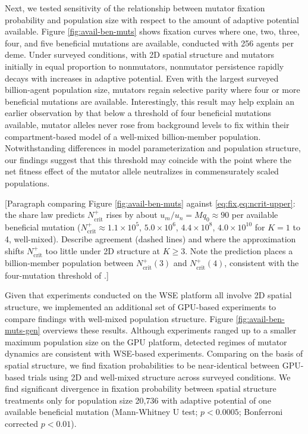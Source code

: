 

Next, we tested sensitivity of the relationship between mutator fixation probability and population size with respect to the amount of adaptive potential available.
Figure \ref{fig:avail-ben-muts} shows fixation curves where one, two, three, four, and five beneficial mutations are available, conducted with 256 agents per deme.
Under surveyed conditions, with 2D spatial structure and mutators initially in equal proportion to nonmutators, nonmutator persistence rapidly decays with increases in adaptive potential.
Even with the largest surveyed billion-agent population size, mutators regain selective parity where four or more beneficial mutations are available.
Interestingly, this result may help explain an earlier observation by \citet{tenaillon1999mutators} that below a threshold of four beneficial mutations available, mutator alleles never rose from background levels to fix within their compartment-based model of a well-mixed billion-member population.
Notwithstanding differences in model parameterization and population structure, our findings suggest that this threshold may coincide with the point where the net fitness effect of the mutator allele neutralizes in commensurately scaled populations.

[Paragraph comparing Figure \ref{fig:avail-ben-muts} against \cref{eq:fix,eq:ncrit-upper}: the share law predicts $N_\mathrm{crit}^{+}$ rises by about $u_m / u_n = M q_0 \approx 90$ per available beneficial mutation ($N_\mathrm{crit}^{+} \approx 1.1 \times 10^5$, $5.0 \times 10^6$, $4.4 \times 10^8$, $4.0 \times 10^{10}$ for $K = 1$ to 4, well-mixed). Describe agreement (dashed lines) and where the approximation shifts $N_\mathrm{crit}^{+}$ too little under 2D structure at $K \geq 3$. Note the prediction places a billion-member population between $N_\mathrm{crit}^{+}(3)$ and $N_\mathrm{crit}^{+}(4)$, consistent with the four-mutation threshold of \citet{tenaillon1999mutators}.]



Given that experiments conducted on the WSE platform all involve 2D spatial structure, we implemented an additional set of GPU-based experiments to compare findings with well-mixed population structure.
Figure \ref{fig:avail-ben-muts-gen} overviews these results.
Although experiments ranged up to a smaller maximum population size on the GPU platform, detected regimes of mutator dynamics are consistent with WSE-based experiments.
Comparing on the basis of spatial structure, we find fixation probabilities to be near-identical between GPU-based trials using 2D and well-mixed structure across surveyed conditions.
We find significant divergence in fixation probability between spatial structure treatments only for population size 20,736 with adaptive potential of one available beneficial mutation (Mann-Whitney U test; $p < 0.0005$; Bonferroni corrected $p < 0.01$).

